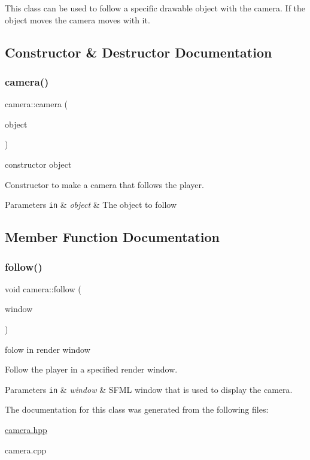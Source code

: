 This class can be used to follow a specific drawable object with the camera. If the object moves the camera moves with it. 

\subsection{Constructor \& Destructor Documentation}
\mbox{\label{classcamera_ac3c67027b5f4f19c6f12db7d909930b5}} 
\subsubsection{\texorpdfstring{camera()}{camera()}}
{\footnotesize\ttfamily camera\+::camera (\begin{DoxyParamCaption}\item[{\hyperlink{drawable_8hpp_aab5add95f06d2ba25dbfed8eb07274fa}{object\+\_\+ptr}}]{object }\end{DoxyParamCaption})}



constructor object 

Constructor to make a camera that follows the player.


\begin{DoxyParams}[1]{Parameters}
\mbox{\tt in}  & {\em object} & The object to follow \\
\hline
\end{DoxyParams}


\subsection{Member Function Documentation}
\mbox{\label{classcamera_a1bb99501ba67453e0ca86f3c8aef5cb1}} 
\subsubsection{\texorpdfstring{follow()}{follow()}}
{\footnotesize\ttfamily void camera\+::follow (\begin{DoxyParamCaption}\item[{sf\+::\+Render\+Window \&}]{window }\end{DoxyParamCaption})}



folow in render window 

Follow the player in a specified render window.


\begin{DoxyParams}[1]{Parameters}
\mbox{\tt in}  & {\em window} & S\+F\+ML window that is used to display the camera. \\
\hline
\end{DoxyParams}


The documentation for this class was generated from the following files\+:\begin{DoxyCompactItemize}
\item 
\hyperlink{camera_8hpp}{camera.\+hpp}\item 
camera.\+cpp\end{DoxyCompactItemize}
